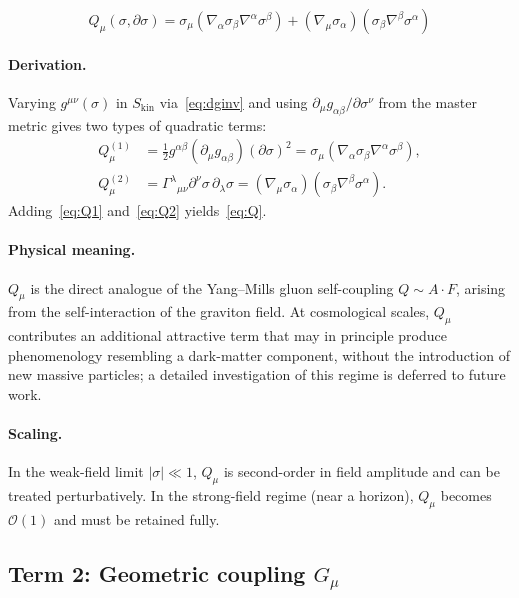 \documentclass[11pt,a4paper]{article}
\theoremstyle{plain}
\theoremstyle{definition}
\theoremstyle{remark}
\newcommand{\half}{\tfrac{1}{2}}
\newcommand{\Skin}{S_{\mathrm{kin}}}
\begin{document}
\begin{equation}
  \boxed{Q_\mu(\sigma,\partial\sigma)
    = \sigma_\mu(\nabla_\alpha\sigma_\beta\nabla^\alpha\sigma^\beta)
    + (\nabla_\mu\sigma_\alpha)(\sigma_\beta\nabla^\beta\sigma^\alpha)}
  \label{eq:Q}
\end{equation}

\paragraph{Derivation.}  Varying $g^{\mu\nu}(\sigma)$ in $\Skin$ via~\eqref{eq:dginv}
and using $\partial_\mu g_{\alpha\beta}/\partial\sigma^\nu$ from the master metric gives
two types of quadratic terms:
\begin{align}
  Q_\mu^{(1)} &= \half g^{\alpha\beta}(\partial_\mu g_{\alpha\beta})(\partial\sigma)^2
                = \sigma_\mu(\nabla_\alpha\sigma_\beta\nabla^\alpha\sigma^\beta),
                \label{eq:Q1}\\
  Q_\mu^{(2)} &= \Gamma^\lambda{}_{\mu\nu}\partial^\nu\sigma\,\partial_\lambda\sigma
                = (\nabla_\mu\sigma_\alpha)(\sigma_\beta\nabla^\beta\sigma^\alpha).
                \label{eq:Q2}
\end{align}
Adding~\eqref{eq:Q1} and~\eqref{eq:Q2} yields~\eqref{eq:Q}.

\paragraph{Physical meaning.}
$Q_\mu$ is the direct analogue of the Yang--Mills gluon self-coupling $Q \sim A\cdot F$, arising from the self-interaction of the graviton field.  At cosmological scales, $Q_\mu$ contributes an additional attractive term that may in principle produce phenomenology resembling a dark-matter component, without the introduction of new massive particles; a detailed investigation of this regime is deferred to future work.

\paragraph{Scaling.}  In the weak-field limit $|\sigma| \ll 1$, $Q_\mu$ is second-order
in field amplitude and can be treated perturbatively.  In the strong-field regime (near
a horizon), $Q_\mu$ becomes $\mathcal{O}(1)$ and must be retained fully.

\subsection{Term 2: Geometric coupling $G_\mu$}
\label{sec:Gmu}
\end{document}
